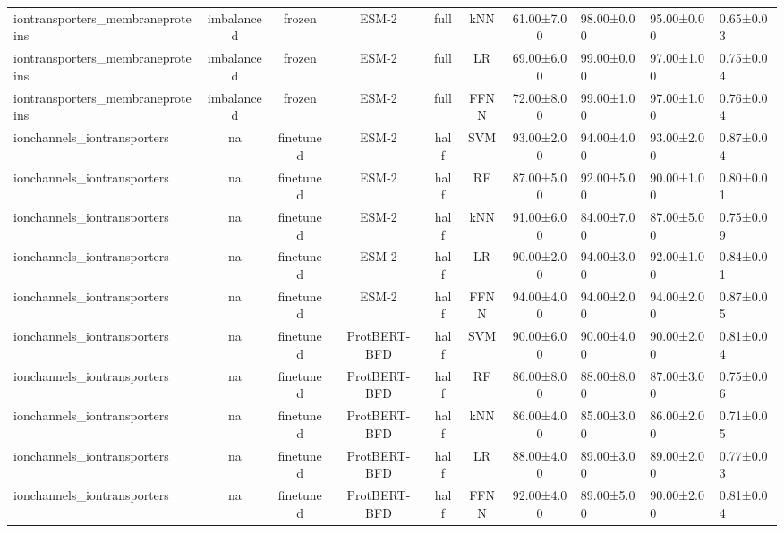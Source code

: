 \begin{tabular}{lcccccc}
iontransporters\_membraneproteins & imbalanced &         frozen &        ESM-2 &      full &        kNN &  61.00±7.00 &  98.00±0.00 &  95.00±0.00 & 0.65±0.03 \\
iontransporters\_membraneproteins & imbalanced &         frozen &        ESM-2 &      full &         LR &  69.00±6.00 &  99.00±0.00 &  97.00±1.00 & 0.75±0.04 \\
iontransporters\_membraneproteins & imbalanced &         frozen &        ESM-2 &      full &       FFNN &  72.00±8.00 &  99.00±1.00 &  97.00±1.00 & 0.76±0.04 \\
     ionchannels\_iontransporters &         na &      finetuned &        ESM-2 &      half &        SVM &  93.00±2.00 &  94.00±4.00 &  93.00±2.00 & 0.87±0.04 \\
     ionchannels\_iontransporters &         na &      finetuned &        ESM-2 &      half &         RF &  87.00±5.00 &  92.00±5.00 &  90.00±1.00 & 0.80±0.01 \\
     ionchannels\_iontransporters &         na &      finetuned &        ESM-2 &      half &        kNN &  91.00±6.00 &  84.00±7.00 &  87.00±5.00 & 0.75±0.09 \\
     ionchannels\_iontransporters &         na &      finetuned &        ESM-2 &      half &         LR &  90.00±2.00 &  94.00±3.00 &  92.00±1.00 & 0.84±0.01 \\
     ionchannels\_iontransporters &         na &      finetuned &        ESM-2 &      half &       FFNN &  94.00±4.00 &  94.00±2.00 &  94.00±2.00 & 0.87±0.05 \\
     ionchannels\_iontransporters &         na &      finetuned & ProtBERT-BFD &      half &        SVM &  90.00±6.00 &  90.00±4.00 &  90.00±2.00 & 0.81±0.04 \\
     ionchannels\_iontransporters &         na &      finetuned & ProtBERT-BFD &      half &         RF &  86.00±8.00 &  88.00±8.00 &  87.00±3.00 & 0.75±0.06 \\
     ionchannels\_iontransporters &         na &      finetuned & ProtBERT-BFD &      half &        kNN &  86.00±4.00 &  85.00±3.00 &  86.00±2.00 & 0.71±0.05 \\
     ionchannels\_iontransporters &         na &      finetuned & ProtBERT-BFD &      half &         LR &  88.00±4.00 &  89.00±3.00 &  89.00±2.00 & 0.77±0.03 \\
     ionchannels\_iontransporters &         na &      finetuned & ProtBERT-BFD &      half &       FFNN &  92.00±4.00 &  89.00±5.00 &  90.00±2.00 & 0.81±0.04 \\

\end{tabular}
